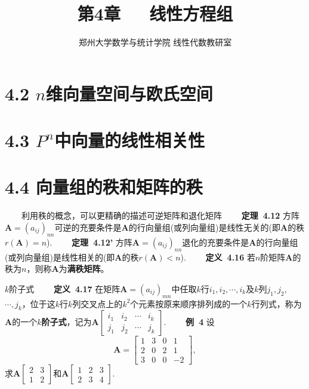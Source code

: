 \documentclass[compress,mathserif,cjk]{beamer}
\title{\textsc{第4章\ \ \ 线性方程组}}
\author{郑州大学数学与统计学院 线性代数教研室}
\date{}
\theoremstyle{remark}
\numberwithin{equation}{section}
\newcommand{\hei}{\bf}      %
\begin{document}
\begin{CJK}{UTF8}{gbsn}
\frame{\titlepage}




\section[4.2]{4.2 $n$维向量空间与欧氏空间}




\section[4.3]{4.3 $P^n$中向量的线性相关性}








\section[4.4]{4.4 向量组的秩和矩阵的秩}




\begin{frame}
 \ \ \ \ 利用秩的概念，可以更精确的描述可逆矩阵和退化矩阵
 \pause\vskip 5pt
 \ \ \ \ {\hei 定理~4.12} 方阵$\bm A=(a_{ij})_{nn}$可逆的充要条件是$\bm A$的行向量组(或列向量组)是线性无关的(即$\bm A$的秩$r(\bm A)=n$).
 \pause\vskip 10pt
 \ \ \ \ {\hei 定理~4.12'} 方阵$\bm A=(a_{ij})_{nn}$退化的充要条件是$\bm A$的行向量组(或列向量组)是线性相关的(即$\bm A$的秩$r(\bm A)<n$).
  \pause\vskip 10pt
 \ \ \ \ {\hei 定义~4.16} 若$n$阶矩阵$\bm A$的秩为$n$，则称$\bm A$为{\hei 满秩矩阵}。
\end{frame}

\begin{frame}{$k$阶子式}
 \ \ \ \ {\hei 定义~4.17} 在矩阵$\bm A=(a_{ij})_{mn}$中任取$k$行$i_1,i_2,\cdots,i_k$及$k$列$j_1,j_2,$ $\cdots,j_k$，位于这$k$行$k$列交叉点上的$k^2$个元素按原来顺序排列成的一个$k$行列式，称为$\bm A$的一个{\hei $k$阶子式}，记为$\bm A\left[\begin{matrix}i_1&i_2&\cdots&i_k\\j_1&j_2&\cdots&j_k\end{matrix}\right]$.
 \pause\vskip 10pt
 \ \ \ \ {\hei 例~4} 设
 $$\bm A=\left[\begin{matrix}1&3&0&1\\2&0&2&1\\3&0&0&-2\end{matrix}\right],$$
 求$\bm A\left[\begin{matrix}2&3\\1&2\end{matrix}\right]$和$\bm A\left[\begin{matrix}1&2&3\\2&3&4\end{matrix}\right]$.
\end{frame}


\end{CJK}
\end{document}
